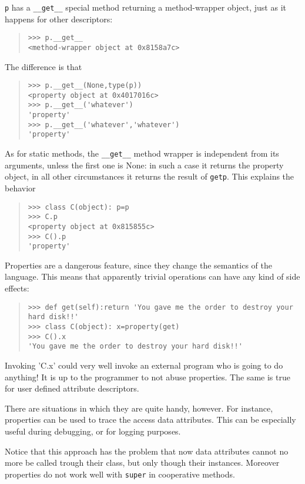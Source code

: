 \documentclass[10pt,english]{article}
\begin{document}
\texttt{p} has a \texttt{{\_}{\_}get{\_}{\_}} special method returning a method-wrapper
object, just as it happens for other descriptors:
\begin{quote}
\begin{verbatim}>>> p.__get__
<method-wrapper object at 0x8158a7c>\end{verbatim}
\end{quote}

The difference is that
\begin{quote}
\begin{verbatim}>>> p.__get__(None,type(p))
<property object at 0x4017016c>
>>> p.__get__('whatever')
'property'
>>> p.__get__('whatever','whatever')
'property'\end{verbatim}
\end{quote}

As for static methods, the \texttt{{\_}{\_}get{\_}{\_}} method wrapper is independent from
its arguments, unless the first one is None: in such a case it returns
the property object, in all other circumstances it returns the result
of \texttt{getp}. This explains the behavior
\begin{quote}
\begin{verbatim}>>> class C(object): p=p
>>> C.p
<property object at 0x815855c>
>>> C().p
'property'\end{verbatim}
\end{quote}

Properties are a dangerous feature, since they change the semantics
of the language. This means that apparently trivial operations can have 
any kind of side effects:
\begin{quote}
\begin{verbatim}>>> def get(self):return 'You gave me the order to destroy your hard disk!!'
>>> class C(object): x=property(get) 
>>> C().x
'You gave me the order to destroy your hard disk!!'\end{verbatim}
\end{quote}

Invoking 'C.x' could very well invoke an external program who is going
to do anything! It is up to the programmer to not abuse properties.
The same is true for user defined attribute descriptors.

There are situations in which they are quite handy, however. For
instance, properties can be used to trace the access data attributes.
This can be especially useful during debugging, or for logging
purposes.

Notice that this approach has the problem that now data attributes cannot 
no more be called trough their class, but only though their instances.
Moreover properties do not work well with \texttt{super} in cooperative
methods.
\end{document}
